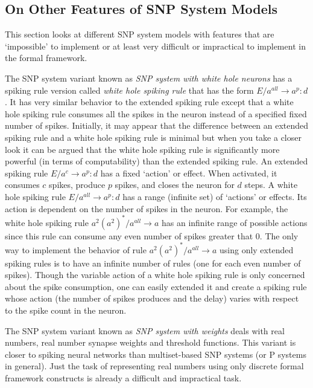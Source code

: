 \documentclass[a4paper]{article}
\theoremstyle{definition}
\newcommand{\ra}{\rightarrow}
\begin{document}

\subsection{On Other Features of SNP System Models}\label{sec-others}

This section looks at different SNP system models with features that are `impossible' to implement 
or at least very difficult or impractical to implement in the formal framework.

The SNP system variant known as \emph{SNP system with white hole neurons} \cite{song-2016-white-hole-neurons}
has a spiking rule version called \emph{white hole spiking rule} that has the form $E/a^{all} \ra 
a^p:d$. It has very similar behavior to the extended spiking rule except that a white hole spiking 
rule consumes all the spikes in the neuron instead of a specified fixed number of spikes. Initially,
it may appear that the difference between an extended spiking rule and a white hole spiking rule is
minimal but when you take a closer look it can be argued that the white hole spiking rule is 
significantly more powerful (in terms of computability) than the extended spiking rule. An
extended spiking rule $E/a^c \ra a^p:d$ has a fixed `action' or effect. When activated, it 
consumes $c$ spikes, produce $p$ spikes, and closes the neuron for $d$ steps. A white hole spiking
rule $E/a^{all} \ra a^p:d$ has a range (infinite set) of `actions' or effects. Its action is
dependent on the number of spikes in the neuron. For example, the white hole spiking rule
$a^2(a^2)^*/a^{all} \ra a$ has an infinite range of possible actions since this rule can consume
any even number of spikes greater that $0$. The only way to implement the behavior of rule
$a^2(a^2)^*/a^{all} \ra a$ using only extended spiking rules is to have an infinite number of
rules (one for each even number of spikes). Though the variable action of a white hole spiking
rule is only concerned about the spike consumption, one can easily extended it and create a spiking 
rule whose action (the number of spikes produces and the delay) varies with respect to the spike
count in the neuron.

The SNP system variant known as \emph{SNP system with weights} \cite{wang-2010-weights} deals with 
real numbers, real number synapse weights and threshold functions. This variant is closer to spiking
neural networks than multiset-based SNP systems (or P systems in general). Just the task of 
representing real numbers using only discrete formal framework constructs is already a difficult and
impractical task.
\end{document}
